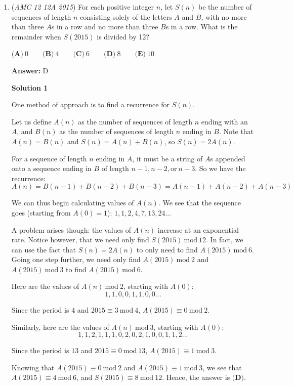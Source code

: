 \begin{enumerate}
 


	\item (\textit{AMC 12 12A 2015}) For each positive integer $n$, let $S(n)$ be the number of sequences of length $n$ consisting solely of the letters $A$ and $B$, with no more than three $A$s in a row and no more than three $B$s in a row. What is the remainder when $S(2015)$ is divided by 12?


 $\textbf{(A)}\ 0 \qquad\textbf{(B)}\ 4 \qquad\textbf{(C)}\ 6 \qquad\textbf{(D)}\ 8 \qquad\textbf{(E)}\ 10$

 \textbf{Answer: }D



\textbf{Solution 1}

One method of approach is to find a recurrence for $S(n)$. 

 Let us define $A(n)$ as the number of sequences of length $n$ ending with an $A$, and $B(n)$ as the number of sequences of length $n$ ending in $B$. Note that $A(n) = B(n)$ and $S(n) = A(n) + B(n)$, so $S(n) = 2A(n)$.

 For a sequence of length $n$ ending in $A$, it must be a string of $A$s appended onto a sequence ending in $B$ of length $n-1, n-2, \text{or}\ n-3$. So we have the recurrence: 
 \[A(n) = B(n-1) + B(n-2) + B(n-3) = A(n-1) + A(n-2) + A(n-3)\]

 We can thus begin calculating values of $A(n)$. We see that the sequence goes (starting from $A(0) = 1$): $1,1,2,4,7,13,24...$ 

 A problem arises though: the values of $A(n)$ increase at an exponential rate. Notice however, that we need only find $S(2015)\ \text{mod}\ 12$. In fact, we can use the fact that $S(n) = 2A(n)$ to only need to find $A(2015)\ \text{mod}\ 6$. Going one step further, we need only find $A(2015)\ \text{mod}\ 2$ and $A(2015)\ \text{mod}\ 3$ to find $A(2015)\ \text{mod}\ 6$.

 Here are the values of $A(n)\ \text{mod}\ 2$, starting with $A(0)$: 
 \[1,1,0,0,1,1,0,0...\]

 Since the period is $4$ and $2015 \equiv 3\ \text{mod}\ 4$, $A(2015) \equiv 0\ \text{mod}\ 2$.

 Similarly, here are the values of $A(n)\ \text{mod}\ 3$,  starting with $A(0)$: 
 \[1,1,2,1,1,1,0,2,0,2,1,0,0,1,1,2...\]

 Since the period is $13$ and $2015 \equiv 0\ \text{mod}\ 13$, $A(2015) \equiv 1\ \text{mod}\ 3$.

 Knowing that $A(2015) \equiv 0\ \text{mod}\ 2$ and $A(2015) \equiv 1\ \text{mod}\ 3$, we see that $A(2015) \equiv 4\ \text{mod}\ 6$, and $S(2015) \equiv 8\ \text{mod}\ 12$. Hence, the answer is $\textbf{(D)}$.


\end{enumerate}
